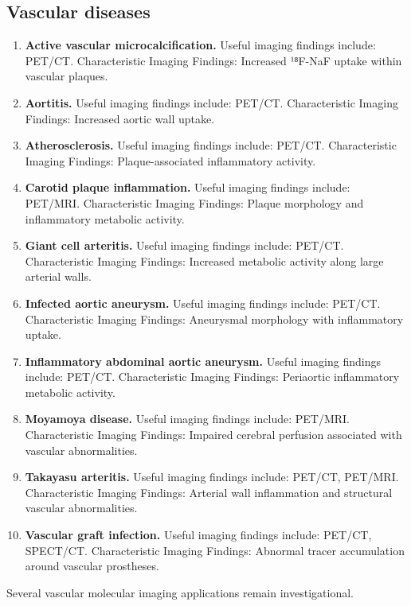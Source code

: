 \subsection{Vascular diseases}
\begin{enumerate}[leftmargin=*,itemsep=0.45em,topsep=0.4em]
\item \textbf{Active vascular microcalcification.} Useful imaging findings include: PET/CT. Characteristic Imaging Findings: Increased ¹⁸F-NaF uptake within vascular plaques.
\item \textbf{Aortitis.} Useful imaging findings include: PET/CT. Characteristic Imaging Findings: Increased aortic wall uptake.
\item \textbf{Atherosclerosis.} Useful imaging findings include: PET/CT. Characteristic Imaging Findings: Plaque-associated inflammatory activity.
\item \textbf{Carotid plaque inflammation.} Useful imaging findings include: PET/MRI. Characteristic Imaging Findings: Plaque morphology and inflammatory metabolic activity.
\item \textbf{Giant cell arteritis.} Useful imaging findings include: PET/CT. Characteristic Imaging Findings: Increased metabolic activity along large arterial walls.
\item \textbf{Infected aortic aneurysm.} Useful imaging findings include: PET/CT. Characteristic Imaging Findings: Aneurysmal morphology with inflammatory uptake.
\item \textbf{Inflammatory abdominal aortic aneurysm.} Useful imaging findings include: PET/CT. Characteristic Imaging Findings: Periaortic inflammatory metabolic activity.
\item \textbf{Moyamoya disease.} Useful imaging findings include: PET/MRI. Characteristic Imaging Findings: Impaired cerebral perfusion associated with vascular abnormalities.
\item \textbf{Takayasu arteritis.} Useful imaging findings include: PET/CT, PET/MRI. Characteristic Imaging Findings: Arterial wall inflammation and structural vascular abnormalities.
\item \textbf{Vascular graft infection.} Useful imaging findings include: PET/CT, SPECT/CT. Characteristic Imaging Findings: Abnormal tracer accumulation around vascular prostheses.
\end{enumerate}
Several vascular molecular imaging applications remain investigational.

